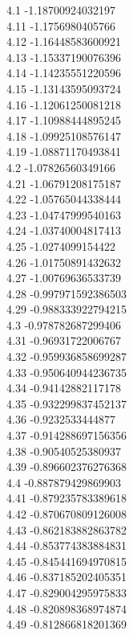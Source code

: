 {4.1	-1.18700924032197\\
4.11	-1.1756980405766\\
4.12	-1.16448583600921\\
4.13	-1.15337190076396\\
4.14	-1.14235551220596\\
4.15	-1.13143595093724\\
4.16	-1.12061250081218\\
4.17	-1.10988444895245\\
4.18	-1.09925108576147\\
4.19	-1.08871170493841\\
4.2	-1.07826560349166\\
4.21	-1.06791208175187\\
4.22	-1.05765044338444\\
4.23	-1.04747999540163\\
4.24	-1.03740004817413\\
4.25	-1.0274099154422\\
4.26	-1.01750891432632\\
4.27	-1.00769636533739\\
4.28	-0.997971592386503\\
4.29	-0.988333922794215\\
4.3	-0.978782687299406\\
4.31	-0.96931722006767\\
4.32	-0.959936858699287\\
4.33	-0.950640944236735\\
4.34	-0.94142882117178\\
4.35	-0.932299837452137\\
4.36	-0.9232533444877\\
4.37	-0.914288697156356\\
4.38	-0.90540525380937\\
4.39	-0.896602376276368\\
4.4	-0.887879429869903\\
4.41	-0.879235783389618\\
4.42	-0.870670809126008\\
4.43	-0.862183882863782\\
4.44	-0.853774383884831\\
4.45	-0.845441694970815\\
4.46	-0.837185202405351\\
4.47	-0.829004295975833\\
4.48	-0.820898368974874\\
4.49	-0.812866818201369\\
}
